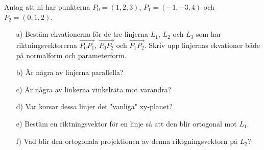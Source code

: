 Antag att ni har punkterna $P_0 = (1,2,3)$, $P_1 = (-1,-3,4)$ och $P_2 = (0,1,2)$.
\begin{itemize}
\item[a) ] Bestäm ekvationerna för de tre linjerna $L_1$, $L_2$ och $L_3$ som har riktningsvektorerna $\vec{P_0 P_1}$, $\vec{P_0 P_2}$ och $\vec{P_1 P_2}$. Skriv upp linjernas ekvationer både på normalform och parameterform. 
\item[b) ] Är några av linjerna parallella?
\item[c) ] Är några av linkerna vinkelräta mot varandra?
\item[d) ] Var korsar dessa linjer det "vanliga" xy-planet?
\item[e) ] Bestäm en riktningsvektor för en linje så att den blir ortogonal mot $L_1$. 
\item[f) ] Vad blir den ortogonala projektionen av denna riktgningsvektorn på $L_2$?
\end{itemize}